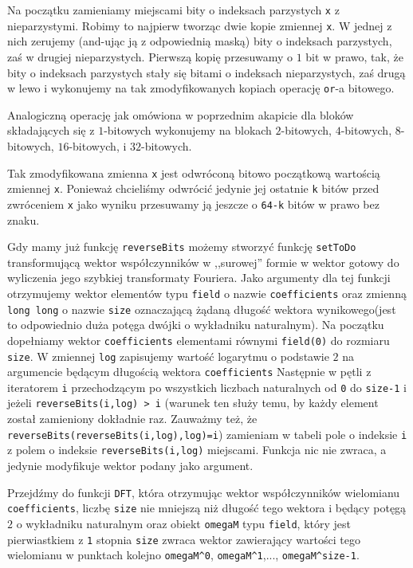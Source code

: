 \documentclass{article}
\begin{document}
Na początku zamieniamy miejscami bity o indeksach parzystych \texttt{x} z nieparzystymi.
Robimy to najpierw tworząc dwie kopie zmiennej \texttt{x}. W jednej z nich zerujemy 
(and-ując ją z odpowiednią maską) bity o indeksach parzystych, zaś w drugiej nieparzystych.
Pierwszą kopię przesuwamy o $1$ bit w prawo, tak, że bity o indeksach parzystych stały się bitami
o indeksach nieparzystych, zaś drugą w lewo i wykonujemy na tak zmodyfikowanych kopiach operację
\texttt{or}-a bitowego. 

Analogiczną operację jak omówiona w poprzednim akapicie dla bloków składających się z $1$-bitowych 
wykonujemy na blokach $2$-bitowych, $4$-bitowych, $8$-bitowych, $16$-bitowych,
i $32$-bitowych. 

Tak zmodyfikowana zmienna \texttt{x} jest odwróconą bitowo początkową wartością zmiennej 
\texttt{x}. Ponieważ chcieliśmy odwrócić jedynie jej ostatnie \texttt{k} bitów przed 
zwróceniem \texttt{x} jako wyniku przesuwamy ją jeszcze o \texttt{64-k} bitów w prawo bez znaku.






Gdy mamy już funkcję \texttt{reverseBits} możemy stworzyć funkcję \texttt{setToDo} transformującą wektor współczynników w ,,surowej'' formie w wektor gotowy
do wyliczenia jego szybkiej transformaty Fouriera. Jako argumenty dla tej funkcji otrzymujemy wektor elementów typu \texttt{field} o nazwie 
\texttt{coefficients} oraz 
zmienną \texttt{long long} o nazwie \texttt{size} oznaczającą żądaną długość wektora wynikowego(jest to odpowiednio duża potęga dwójki o wykładniku naturalnym). 
Na początku dopełniamy wektor 
\texttt{coefficients} elementami równymi \texttt{field(0)} do rozmiaru \texttt{size}. 
W zmiennej \texttt{log} zapisujemy wartość logarytmu o podstawie $2$ na argumencie będącym długością
wektora \texttt{coefficients}
Następnie w pętli z iteratorem \texttt{i} przechodzącym po wszystkich liczbach naturalnych od \texttt{0} do 
\texttt{size-1} i jeżeli \texttt{reverseBits(i,log) > i} (warunek ten służy temu, by każdy element został zamieniony dokładnie raz. 
Zauważmy też, że \texttt{reverseBits(reverseBits(i,log),log)=i}) zamieniam w tabeli pole o indeksie \texttt{i} z polem o indeksie 
\texttt{reverseBits(i,log)} miejscami. Funkcja nic nie zwraca, a jedynie modyfikuje wektor podany jako argument.

Przejdźmy do funkcji \texttt{DFT}, która otrzymując wektor współczynników wielomianu \texttt{coefficients}, 
liczbę \texttt{size} nie mniejszą niż długość tego wektora i będący potęgą $2$ o wykładniku naturalnym oraz obiekt \texttt{omegaM} typu \texttt{field},
który jest pierwiastkiem z \texttt{1} stopnia \texttt{size} zwraca wektor zawierający wartości tego wielomianu w punktach kolejno 
\texttt{omegaM}\verb!^!\texttt{0}, \texttt{omegaM}\verb!^!\texttt{1},..., \texttt{omegaM}\verb!^!\texttt{size-1}. 
\end{document}
